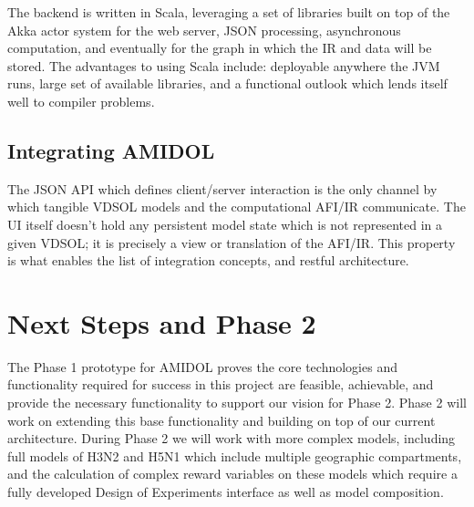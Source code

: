 \documentclass[11pt]{article}
\newcommand{\amidol}{\textsc{AMIDOL}}
\begin{document}
The backend is written in Scala, leveraging a set of libraries built on top of the Akka actor system for the web server, JSON processing, asynchronous computation, and eventually for the graph in which the IR and data will be stored. The advantages to using Scala include: deployable anywhere the JVM runs, large set of available libraries, and a functional outlook which lends itself well to compiler problems.

\subsection{Integrating AMIDOL}

The JSON API which defines client/server interaction is the only channel by which tangible VDSOL models and the computational AFI/IR communicate. The UI itself doesn't hold any persistent model state which is not represented in a given VDSOL; it is precisely a view or translation of the AFI/IR. This property is what enables the list of integration concepts, and restful architecture.

\section{Next Steps and Phase 2}

The Phase 1 prototype for \amidol{} proves the core technologies and functionality required for success in this project are feasible, achievable, and provide the necessary functionality to support our vision for Phase 2.  Phase 2 will work on extending this base functionality and building on top of our current architecture.  During Phase 2 we will work with more complex models, including full models of H3N2 and H5N1 which include multiple geographic compartments, and the calculation of complex reward variables on these models which require a fully developed Design of Experiments interface as well as model composition.
\end{document}
